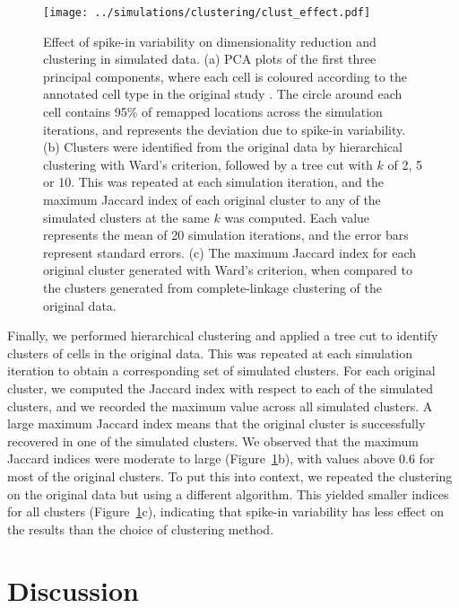\documentclass{article}
\begin{document}
\begin{figure}[btp]
    \begin{center}
        \texttt{[image: ../simulations/clustering/clust\_effect.pdf]}
    \end{center}
    \caption{Effect of spike-in variability on dimensionality reduction and clustering in simulated data.
        (a) PCA plots of the first three principal components, where each cell is coloured according to the annotated cell type in the original study \cite{segerstople2016single}.
        The circle around each cell contains 95\% of remapped locations across the simulation iterations, and represents the deviation due to spike-in variability.
        (b) Clusters were identified from the original data by hierarchical clustering with Ward's criterion, followed by a tree cut with $k$ of 2, 5 or 10.
        This was repeated at each simulation iteration, and the maximum Jaccard index of each original cluster to any of the simulated clusters at the same $k$ was computed.
        Each value represents the mean of 20 simulation iterations, and the error bars represent standard errors.
        (c) The maximum Jaccard index for each original cluster generated with Ward's criterion, when compared to the clusters generated from complete-linkage clustering of the original data.
    }
    \label{fig:dimclust}
\end{figure}

Finally, we performed hierarchical clustering and applied a tree cut to identify clusters of cells in the original data.
This was repeated at each simulation iteration to obtain a corresponding set of simulated clusters.
For each original cluster, we computed the Jaccard index with respect to each of the simulated clusters, and we recorded the maximum value across all simulated clusters.
A large maximum Jaccard index means that the original cluster is successfully recovered in one of the simulated clusters.
We observed that the maximum Jaccard indices were moderate to large (Figure~\ref{fig:dimclust}b), with values above 0.6 for most of the original clusters.
To put this into context, we repeated the clustering on the original data but using a different algorithm.
This yielded smaller indices for all clusters (Figure~\ref{fig:dimclust}c), indicating that spike-in variability has less effect on the results than the choice of clustering method.

\section{Discussion}
\end{document}
